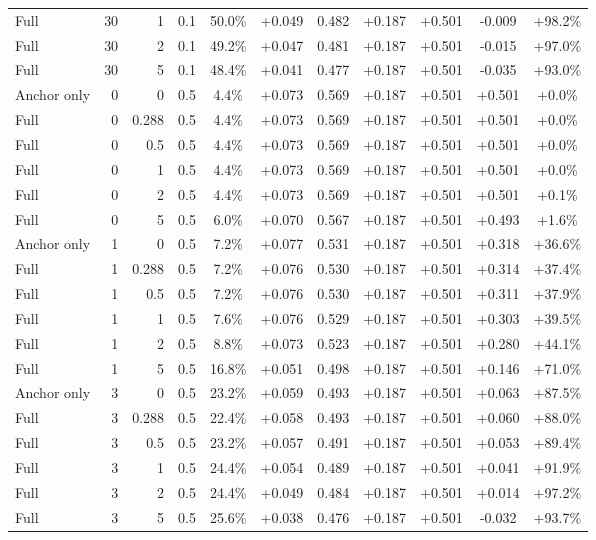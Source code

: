 \begin{table}[htbp]
\begin{tabular}{lrrrccccccc}
Full & 30 & 1 & 0.1 & 50.0\% & +0.049 & 0.482 & +0.187 & +0.501 & -0.009 & +98.2\% \\
Full & 30 & 2 & 0.1 & 49.2\% & +0.047 & 0.481 & +0.187 & +0.501 & -0.015 & +97.0\% \\
Full & 30 & 5 & 0.1 & 48.4\% & +0.041 & 0.477 & +0.187 & +0.501 & -0.035 & +93.0\% \\
Anchor only & 0 & 0 & 0.5 & 4.4\% & +0.073 & 0.569 & +0.187 & +0.501 & +0.501 & +0.0\% \\
Full & 0 & 0.288 & 0.5 & 4.4\% & +0.073 & 0.569 & +0.187 & +0.501 & +0.501 & +0.0\% \\
Full & 0 & 0.5 & 0.5 & 4.4\% & +0.073 & 0.569 & +0.187 & +0.501 & +0.501 & +0.0\% \\
Full & 0 & 1 & 0.5 & 4.4\% & +0.073 & 0.569 & +0.187 & +0.501 & +0.501 & +0.0\% \\
Full & 0 & 2 & 0.5 & 4.4\% & +0.073 & 0.569 & +0.187 & +0.501 & +0.501 & +0.1\% \\
Full & 0 & 5 & 0.5 & 6.0\% & +0.070 & 0.567 & +0.187 & +0.501 & +0.493 & +1.6\% \\
Anchor only & 1 & 0 & 0.5 & 7.2\% & +0.077 & 0.531 & +0.187 & +0.501 & +0.318 & +36.6\% \\
Full & 1 & 0.288 & 0.5 & 7.2\% & +0.076 & 0.530 & +0.187 & +0.501 & +0.314 & +37.4\% \\
Full & 1 & 0.5 & 0.5 & 7.2\% & +0.076 & 0.530 & +0.187 & +0.501 & +0.311 & +37.9\% \\
Full & 1 & 1 & 0.5 & 7.6\% & +0.076 & 0.529 & +0.187 & +0.501 & +0.303 & +39.5\% \\
Full & 1 & 2 & 0.5 & 8.8\% & +0.073 & 0.523 & +0.187 & +0.501 & +0.280 & +44.1\% \\
Full & 1 & 5 & 0.5 & 16.8\% & +0.051 & 0.498 & +0.187 & +0.501 & +0.146 & +71.0\% \\
Anchor only & 3 & 0 & 0.5 & 23.2\% & +0.059 & 0.493 & +0.187 & +0.501 & +0.063 & +87.5\% \\
Full & 3 & 0.288 & 0.5 & 22.4\% & +0.058 & 0.493 & +0.187 & +0.501 & +0.060 & +88.0\% \\
Full & 3 & 0.5 & 0.5 & 23.2\% & +0.057 & 0.491 & +0.187 & +0.501 & +0.053 & +89.4\% \\
Full & 3 & 1 & 0.5 & 24.4\% & +0.054 & 0.489 & +0.187 & +0.501 & +0.041 & +91.9\% \\
Full & 3 & 2 & 0.5 & 24.4\% & +0.049 & 0.484 & +0.187 & +0.501 & +0.014 & +97.2\% \\
Full & 3 & 5 & 0.5 & 25.6\% & +0.038 & 0.476 & +0.187 & +0.501 & -0.032 & +93.7\% \\

\end{tabular}
\end{table}
